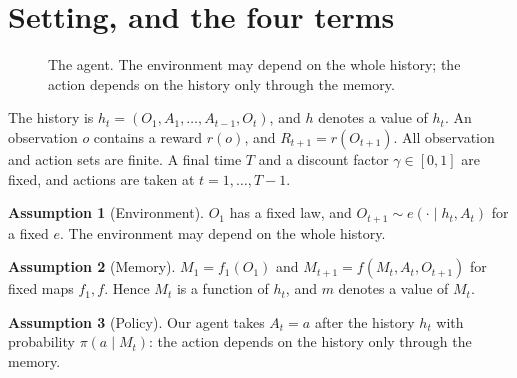 \documentclass{article}
\theoremstyle{definition}
\newtheorem{assumption}{Assumption}
\begin{document}
\section{Setting, and the four terms}\label{sec:setting}

\begin{figure}[h]
\centering
{}
\caption{The agent. The environment may depend on the whole history; the action depends on the history only through the memory.}\label{fig:agent}
\end{figure}

The history is $h_t=(O_1,A_1,\dots,A_{t-1},O_t)$, and $h$ denotes a value of $h_t$. An observation $o$ contains a reward $r(o)$, and $R_{t+1}=r(O_{t+1})$. All observation and action sets are finite. A final time $T$ and a discount factor $\gamma\in[0,1]$ are fixed, and actions are taken at $t=1,\dots,T-1$.

\begin{assumption}[Environment]\label{as:env}
$O_1$ has a fixed law, and $O_{t+1}\sim e(\cdot\mid h_t,A_t)$ for a fixed $e$. The environment may depend on the whole history.
\end{assumption}

\begin{assumption}[Memory]\label{as:mem}
$M_1=f_1(O_1)$ and $M_{t+1}=f(M_t,A_t,O_{t+1})$ for fixed maps $f_1,f$. Hence $M_t$ is a function of $h_t$, and $m$ denotes a value of $M_t$.
\end{assumption}

\begin{assumption}[Policy]\label{as:pol}
Our agent takes $A_t=a$ after the history $h_t$ with probability $\pi(a\mid M_t)$: the action depends on the history only through the memory.
\end{assumption}
\end{document}
